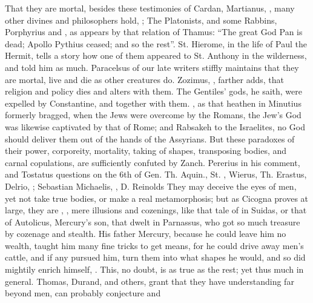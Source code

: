 That they are mortal, besides these testimonies of Cardan, Martianus, \etc{},
many other divines and philosophers hold, ; The Platonists, and some Rabbins, Porphyrius and
\Plutarch{}, as appears by that relation of Thamus: \enquote{The
great God Pan is dead; Apollo Pythius ceased; and so the rest}. St. Hierome, in
the life of Paul the Hermit, tells a story how one of them appeared to St.
Anthony in the wilderness, and told him as much.
Paracelsus of our late writers stiffly maintains that they
are mortal, live and die as other creatures do. Zozimus,
, farther adds, that religion and policy dies and
alters with them. The Gentiles' gods, he saith, were
expelled by Constantine, and together with them. , as that heathen in Minutius
formerly bragged, when the Jews were overcome by the Romans, the Jew's God was
likewise captivated by that of Rome; and Rabsakeh to the Israelites, no God
should deliver them out of the hands of the Assyrians. But these paradoxes of
their power, corporeity, mortality, taking of shapes, transposing bodies, and
carnal copulations, are sufficiently confuted by Zanch.  Pererius in his comment, and Tostatus questions on the 6th of Gen.
Th. Aquin., St. \Austin{}, Wierus, Th. Erastus, Delrio, ; Sebastian Michaelis, , D. Reinolds  They may deceive the
eyes of men, yet not take true bodies, or make a real metamorphosis; but as
Cicogna proves at large, they are , , mere illusions and cozenings, like that tale of 
in Suidas, or that of Autolicus, Mercury's son, that dwelt in Parnassus, who
got so much treasure by cozenage and stealth. His father Mercury, because he
could leave him no wealth, taught him many fine tricks to get means,
for he could drive away men's cattle, and if any pursued
him, turn them into what shapes he would, and so did mightily enrich himself,
. This, no doubt, is as true as the
rest; yet thus much in general. Thomas, Durand, and others, grant that they
have understanding far beyond men, can probably conjecture and
